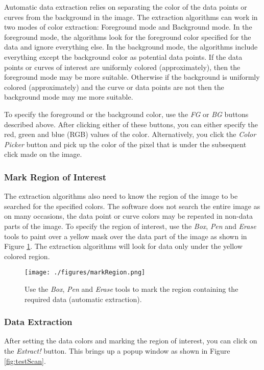 \documentclass[letterpaper, 10pt]{article}
\begin{document}
Automatic data extraction relies on separating the color of the data points or curves from the background in the image. The extraction algorithms can work in two modes of color extraction: Foreground mode and Background mode. In the foreground mode, the algorithms look for the foreground color specified for the data and ignore everything else. In the background mode, the algorithms include everything except the background color as potential data points. If the data points or curves of interest are uniformly colored (approximately), then the foreground mode may be more suitable. Otherwise if the background is uniformly colored (approximately) and the curve or data points are not then the background mode may me more suitable.

To specify the foreground or the background color, use the \emph{FG} or \emph{BG} buttons described above. After clicking either of these buttons, you can either specify the red, green and blue (RGB) values of the color. Alternatively, you click the \emph{Color Picker} button and pick up the color of the pixel that is under the subsequent click made on the image.
\subsubsection{Mark Region of Interest}
The extraction algorithms also need to know the region of the image to be searched for the specified colors. The software does not search the entire image as on many occasions, the data point or curve colors may be repeated in non-data parts of the image. To specify the region of interest, use the \emph{Box}, \emph{Pen} and \emph{Erase} tools to paint over a yellow mask over the data part of the image as shown in Figure \ref{fig:markRegion}. The extraction algorithms will look for data only under  the yellow colored region. 
\begin{figure}
\begin{center}
\texttt{[image: ./figures/markRegion.png]}
\caption{Use the \emph{Box}, \emph{Pen} and \emph{Erase} tools to mark the region containing the required data (automatic extraction).}
\label{fig:markRegion}
\end{center}
\end{figure}

\subsubsection{Data Extraction}
After setting the data colors and marking the region of interest, you can click on the \emph{Extract!} button. This brings up a popup window as shown in Figure \ref{fig:testScan}. 
\end{document}
